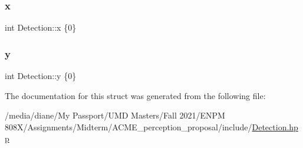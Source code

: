 \mbox{\label{struct_detection_a7b71921325261514cd6dd42c8e90ba70}} 
\subsubsection{\texorpdfstring{x}{x}}
{\footnotesize\ttfamily int Detection\+::x \{0\}}

\mbox{\label{struct_detection_afa5d065ea13ce74dfd52c6a569313270}} 
\subsubsection{\texorpdfstring{y}{y}}
{\footnotesize\ttfamily int Detection\+::y \{0\}}



The documentation for this struct was generated from the following file\+:\begin{DoxyCompactItemize}
\item 
/media/diane/\+My Passport/\+U\+M\+D Masters/\+Fall 2021/\+E\+N\+P\+M 808\+X/\+Assignments/\+Midterm/\+A\+C\+M\+E\+\_\+perception\+\_\+proposal/include/\hyperlink{_detection_8hpp}{Detection.\+hpp}\end{DoxyCompactItemize}
